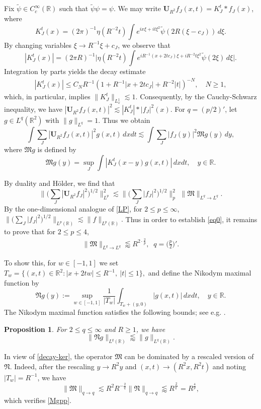 \documentclass[11pt]{amsart}
\newtheorem{prop}[theorem]{Proposition}
\theoremstyle{definition}
\theoremstyle{remark}
\newcommand{\R}{\mathbb{R}}
\newcommand{\bU}{\mathbf{U}}
\newcommand{\les}{\lesssim}
\newcommand{\less}{\lessapprox}
\begin{document}
Fix $\tilde \psi \in C_c^\infty(\R)$  such that $\tilde \psi \psi=\psi$.
We may write $\mathbf U_{R^2} f_J(x,t)=K_J^t\ast f_J(x)$, where 
\[
K_J^t(x) = (2\pi)^{-1}\eta(R^{-2}t)\int e^{ix\xi+it\xi^2} \tilde \psi(2R(\xi-c_J))\,d\xi.
\]
By changing variables $\xi\rightarrow R^{-1}\xi+c_J$,
we observe that
\[
|K_J^t(x)|=(2\pi R)^{-1}\Big|\eta(R^{-2}t)\int e^{iR^{-1}(x+2tc_J)\xi+iR^{-2}t\xi^2}\tilde\psi(2\xi)\,d\xi\Big|.
\]
Integration by parts yields the decay estimate
\begin{align}\label{decay-ker}
|K_J^t(x)|
\le C_N R^{-1}(1+R^{-1}|x+2tc_J|+R^{-2}|t|)^{-N}, \quad N\ge1,
\end{align}
which, in particular, implies $\|K_J^t\|_{L_x^1} \lesssim 1$.
Consequently, by the Cauchy-Schwarz inequality, we have
$
   |\mathbf U_{R^2} f_J(x,t)|^2\lesssim  |K_J^t|*|f_J|^2(x). 
$
For $q=(p/2)'$, let $g \in L^{q}(\R^2)$ with $\|g\|_{L^{q}}=1$. Thus we obtain
\[ \int \sum_J |\bU_{R^2}f_J(x,t)|^2 g(x,t)\,dxdt \les \int \sum_J |f_J(y)|^2 \mathfrak Mg (y) \,dy, \]
where $\mathfrak Mg$ is defined by
\[
\mathfrak Mg (y) = \sup_J \int |K_J^t(x-y) g(x,t)|\,dxdt, \quad y\in \R.
\]

By duality and H\"older, we find that 
\[ \Big\| \big(\sum_J |\mathbf U_{R^2} f_J|^2\big)^{1/2} \Big\|_{L^p}^{2}
\lesssim
\big\|\big(\sum_{J} |f_J|^2 \big)^{1/2}\big\|_p^2
\,\,\big\| 
\mathfrak M 
\big\|_{L^{q} \to L^q}.\]
By the one-dimensional analogue of \eqref{LP}, for $2\le p \le \infty$,
$
\big\| \big(\sum_J |f_J|^2 \big)^{1/2}\big\|_{L^p(\R)}\lesssim \|f\|_{L^p(\R)}.
$
Thus in order to establish \eqref{eq0}, it remains to prove that for $2\le p \le 4$, 
\begin{align}\label{Mgpp}
\big\|\mathfrak M\big\|_{L^{q} \to L^q}
\less R^{2\cdot\frac 2p}, \;\; q=\Big(\frac p2\Big)'.
\end{align}

To show this, for $w\in [-1,1]$ we set
$
T_w = \{(x,t)\in \R^2: |x+2tw| \le R^{-1}, ~|t|\le 1\},
$
and define the Nikodym maximal function by
\[
\mathfrak Ng(y):= \sup_{w \in [-1,1]} \frac{1}{|T_w|}\int_{T_w+(y,0)} |g(x,t)|\,dxdt, \quad y\in\R.
\]
The Nikodym maximal function satisfies the following bounds; see e.g. \cite{MSS, Yung}.
\begin{prop}
For $2 \le q \le \infty$ and $R\ge1$, we have
\[
\| \mathfrak Ng\|_{L^q(\R)} \less \|g\|_{L^q(\R)}.
\]
\end{prop}

In view of \eqref{decay-ker}, the operator $\mathfrak M$ can be dominated by a rescaled version of $\mathfrak N$. Indeed, after the rescaling $y\rightarrow R^2y$ and $(x,t)\rightarrow (R^2x,R^2t)$ and noting $|T_w|=R^{-1}$, we have
\[
\|\mathfrak M\|_{q\rightarrow q} \lesssim R^2 R^{-\frac2q}\|\mathfrak N\|_{q\rightarrow q} \less R^{\frac{2}{q'}} = R^{\frac{4}{p}},
\]
which verifies \eqref{Mgpp}.
\end{document}
